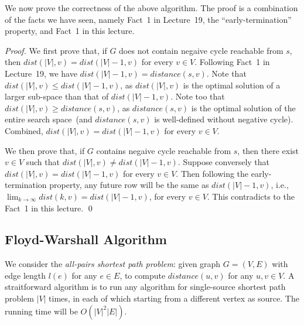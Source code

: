 \begin{minipage}{0.8\textwidth}
	\xxx
	\xxx
	\xxx
	\xxx
	\xxx
	\xxx
	\xxx
	\xxx
\end{minipage}

We now prove the correctness of the above algorithm.
The proof is a combination of the facts we have seen, namely Fact~1 in Lecture~19, the ``early-termination'' property,
and Fact~1 in this lecture.

\emph{Proof.} We first prove that, if $G$ does not contain negaive cycle reachable from $s$, then $dist(|V|, v) = dist(|V| - 1, v)$ for every $v\in V$.
Following Fact~1 in Lecture~19, we have $dist(|V| - 1, v) = distance(s,v)$.
Note that $dist(|V|, v) \le dist(|V| - 1, v)$, as $dist(|V|,v)$ is the optimal solution of a larger sub-space than that of $dist(|V|-1,v)$.
Note too that $dist(|V|,v) \ge distance(s,v)$, as $distance(s,v)$ is the optimal solution of the entire search space~(and
$distance(s,v)$ is well-defined without negative cycle).
Combined, $dist(|V|, v) = dist(|V| - 1, v)$ for every $v\in V$.

We then prove that, if $G$ contains negaive cycle reachable from $s$, then there exist $v\in V$ such that $dist(|V|, v) \neq dist(|V| - 1, v)$.
Suppose conversely that $dist(|V|, v) = dist(|V| - 1, v)$ for every $v\in V$.
Then following the early-termination property, any future row will be the same as $dist(|V|-1,v)$, i.e., $\lim_{k\to\infty} dist(k, v) = dist(|V| - 1, v)$, for every $v\in V$.
This contradicts to the Fact~1 in this lecture. \qed

\subsection*{Floyd-Warshall Algorithm}

We consider the \emph{all-pairs shortest path problem}: given graph $G = (V, E)$ with edge length $l(e)$ for any $e\in E$,
to compute $distance(u,v)$ for any $u,v\in V$. A straitforward algorithm is to run any algorithm for single-source shortest path problem
$|V|$ times, in each of which starting from a different vertex as source. The running time will be $O(|V|^2|E|)$.

